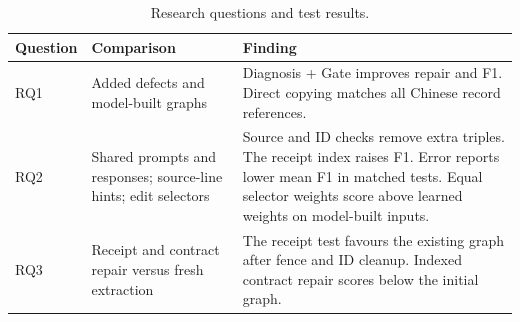 \begin{table}[t]
\centering
\caption{Research questions and test results.}
\label{tab:research_answers}
\small
\begin{tabularx}{\textwidth}{@{}p{}XX@{}}
\toprule
Question & Comparison & Finding \\
\midrule
RQ1 & Added defects and model-built graphs
& Diagnosis + Gate improves repair and F1. Direct copying matches all Chinese record references. \\
RQ2 & Shared prompts and responses; source-line hints; edit selectors
& Source and ID checks remove extra triples. The receipt index raises F1. Error reports lower mean F1 in matched tests. Equal selector weights score above learned weights on model-built inputs. \\
RQ3 & Receipt and contract repair versus fresh extraction
& The receipt test favours the existing graph after fence and ID cleanup. Indexed contract repair scores below the initial graph. \\
\bottomrule
\end{tabularx}
\end{table}
